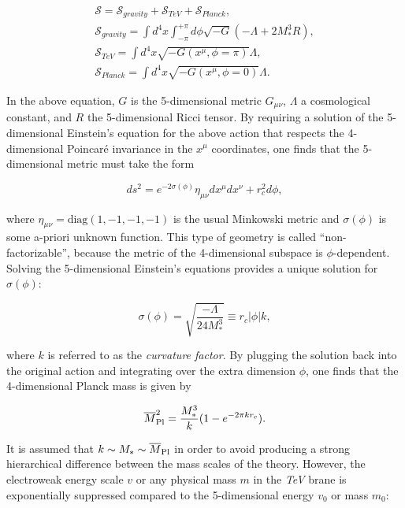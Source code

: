\begin{equation}\label{eqn:WED_2}
\begin{gathered}
\mathcal{S} = \mathcal{S}_{gravity} + \mathcal{S}_{TeV} + \mathcal{S}_{Planck}, \\
\mathcal{S}_{gravity} = \int d^4x \int_{-\pi}^{+\pi} d\phi\sqrt{-G}(-\Lambda+2M^3_*R), \\
\mathcal{S}_{TeV} = \int d^4x\sqrt{-G(x^\mu,\phi=\pi)}\Lambda, \\
\mathcal{S}_{Planck} = \int d^4x\sqrt{-G(x^\mu,\phi=0)}\Lambda.
\end{gathered}
\end{equation}

In the above equation, $G$ is the 5-dimensional metric $G_{\mu\nu}$, $\Lambda$ a cosmological constant, and $R$ the 5-dimensional Ricci tensor.
By requiring a solution of the 5-dimensional Einstein's equation for the above action that respects the 4-dimensional Poincar\'{e} invariance in the $x^\mu$ coordinates,
one finds that the 5-dimensional metric must take the form 

\begin{equation}\label{eqn:WED_3}
ds^2 = e^{-2\sigma(\phi)} \eta_{\mu\nu}dx^\mu dx^\nu + r^2_cd\phi,
\end{equation}

\noindent where $\eta_{\mu\nu} = \mathrm{diag}(1,-1,-1,-1)$ is the usual Minkowski metric and $\sigma(\phi)$ is some a-priori unknown function.
This type of geometry is called ``non-factorizable'', because the metric of the 4-dimensional subspace is $\phi$-dependent.
Solving the 5-dimensional Einstein's equations provides a unique solution for $\sigma(\phi)$:

\begin{equation}\label{eqn:WED_4}
\sigma(\phi) = \sqrt{\frac{-\Lambda}{24M^3_*}} \equiv r_c|\phi|k,
\end{equation}

\noindent where $k$ is referred to as the \textit{curvature factor}.
By plugging the solution back into the original action and integrating over the extra dimension $\phi$, one finds that the 4-dimensional Planck mass is given by

\begin{equation}\label{eqn:WED_5}
\overline{M}_\mathrm{Pl}^2 = \frac{M^3_*}{k}(1 - e^{-2\pi kr_c}).
\end{equation}

It is assumed that $k \sim M_* \sim \overline{M}_\mathrm{Pl}$ in order to avoid producing a strong hierarchical difference between the mass scales of the theory.
However, the electroweak energy scale $v$ or any physical mass $m$ in the \textit{TeV} brane is exponentially suppressed compared to the 5-dimensional energy $v_0$ or mass $m_0$:

